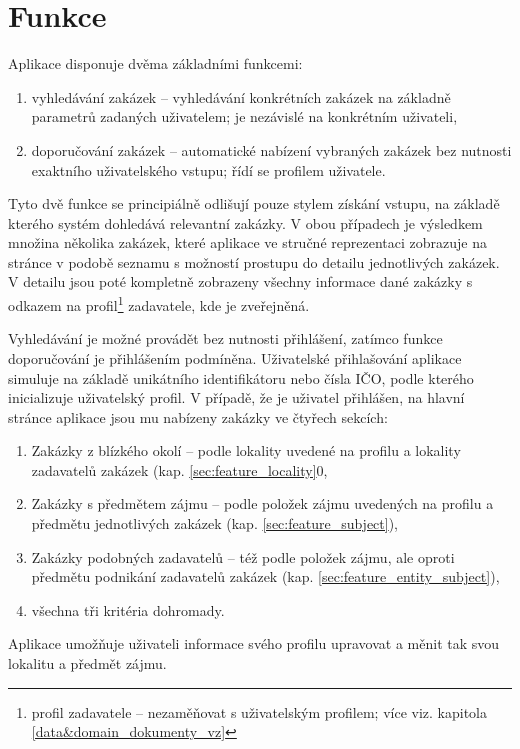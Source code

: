 \documentclass[thesis=M,czech]{FITthesis}[2019/12/23]
\begin{document}
\section{Funkce}

Aplikace disponuje dvěma základními funkcemi:
\begin{enumerate}
    \item vyhledávání zakázek -- vyhledávání konkrétních zakázek na základně parametrů zadaných uživatelem; je nezávislé na konkrétním uživateli,
    \item doporučování zakázek -- automatické nabízení vybraných zakázek bez nutnosti exaktního uživatelského vstupu; řídí se profilem uživatele.
\end{enumerate}
Tyto dvě funkce se principiálně odlišují pouze stylem získání vstupu, na základě kterého systém dohledává relevantní zakázky. V obou případech je výsledkem množina několika zakázek, které aplikace ve stručné reprezentaci zobrazuje na stránce v podobě seznamu s možností prostupu do detailu jednotlivých zakázek. V detailu jsou poté kompletně zobrazeny všechny informace dané zakázky s odkazem na profil\footnote{profil zadavatele -- nezaměňovat s uživatelským profilem; více viz. kapitola \ref{data&domain_dokumenty_vz}} zadavatele, kde je zveřejněná.

Vyhledávání je možné provádět bez nutnosti přihlášení, zatímco funkce doporučování je přihlášením podmíněna. Uživatelské přihlašování aplikace simuluje na základě unikátního identifikátoru nebo čísla IČO, podle kterého inicializuje uživatelský profil.
\newpage
V případě, že je uživatel přihlášen, na hlavní stránce aplikace jsou mu nabízeny zakázky ve čtyřech sekcích:
\begin{enumerate}
    \item Zakázky z blízkého okolí -- podle lokality uvedené na profilu a lokality zadavatelů zakázek (kap. \ref{sec:feature_locality}0,
    \item Zakázky s předmětem zájmu -- podle položek zájmu uvedených na profilu a předmětu jednotlivých zakázek (kap. \ref{sec:feature_subject}),
    \item Zakázky podobných zadavatelů -- též podle položek zájmu, ale oproti předmětu podnikání zadavatelů zakázek (kap. \ref{sec:feature_entity_subject}),
    \item všechna tři kritéria dohromady.
\end{enumerate}
Aplikace umožňuje uživateli informace svého profilu upravovat a měnit tak svou lokalitu a předmět zájmu.
\end{document}
